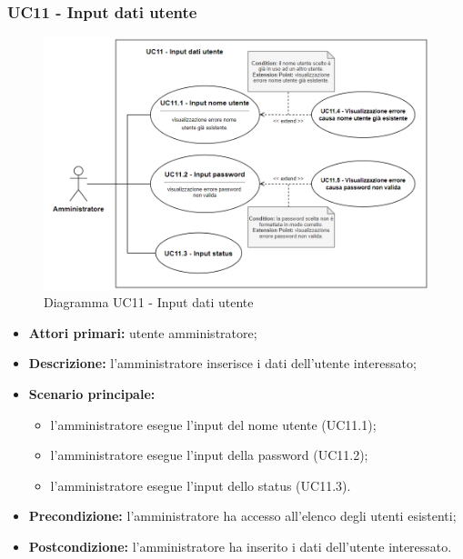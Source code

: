 \subsubsection{UC11 - Input dati utente}
	\begin{figure}[H]
		\centering
		\includegraphics[width=15cm]{images/UC11.png}
		\caption{Diagramma UC11 - Input dati utente}
	\end{figure}
	\begin{itemize}
		\item \textbf{Attori primari:} utente amministratore;
		\item \textbf{Descrizione:} l'amministratore inserisce i dati dell'utente interessato;
		\item \textbf{Scenario principale:} 
			\begin{itemize}
				\item l'amministratore esegue l'input del nome utente (UC11.1);
				\item l'amministratore esegue l'input della password (UC11.2);
				\item l'amministratore esegue l'input dello status (UC11.3).
			\end{itemize}
		\item \textbf{Precondizione:} l'amministratore ha accesso all'elenco degli utenti esistenti;
		\item \textbf{Postcondizione:} l'amministratore ha inserito i dati dell'utente interessato.
	\end{itemize}

